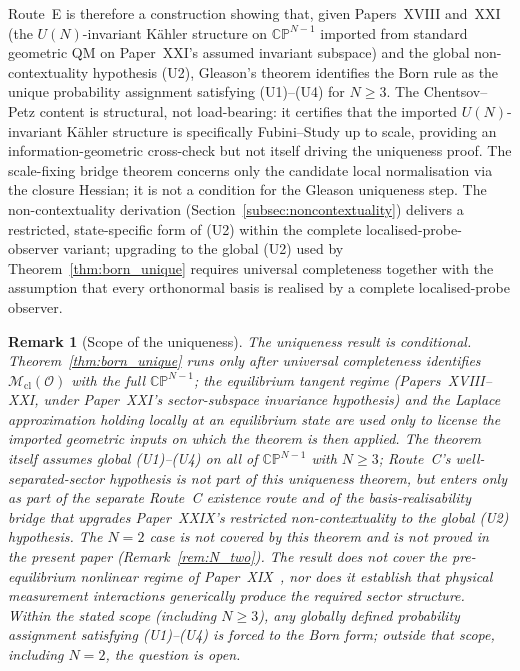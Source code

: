 \documentclass[12pt]{article}
\newtheorem{remark}[theorem]{Remark}
\newcommand{\Ocal}{\mathcal{O}}
\newcommand{\Mcl}{\mathcal{M}_{\mathrm{cl}}}
\begin{document}
Route~E is therefore a construction showing that, given Papers~XVIII and~XXI (the $U(N)$-invariant K\"ahler structure on $\mathbb{CP}^{N-1}$ imported from standard geometric QM on Paper~XXI's assumed invariant subspace) and the global non-contextuality hypothesis (U2), Gleason's theorem identifies the Born rule as the unique probability assignment satisfying (U1)--(U4) for $N \geq 3$. The Chentsov--Petz content is structural, not load-bearing: it certifies that the imported $U(N)$-invariant K\"ahler structure is specifically Fubini--Study up to scale, providing an information-geometric cross-check but not itself driving the uniqueness proof. The scale-fixing bridge theorem concerns only the candidate local normalisation via the closure Hessian; it is not a condition for the Gleason uniqueness step. The non-contextuality derivation (Section~\ref{subsec:noncontextuality}) delivers a restricted, state-specific form of (U2) within the complete localised-probe-observer variant; upgrading to the global (U2) used by Theorem~\ref{thm:born_unique} requires universal completeness together with the assumption that every orthonormal basis is realised by a complete localised-probe observer.

\begin{remark}[Scope of the uniqueness]\label{rem:scope}
The uniqueness result is conditional. Theorem~\ref{thm:born_unique} runs only after universal completeness identifies $\Mcl(\Ocal)$ with the full $\mathbb{CP}^{N-1}$; the equilibrium tangent regime (Papers~XVIII--XXI, under Paper~XXI's sector-subspace invariance hypothesis) and the Laplace approximation holding locally at an equilibrium state are used only to license the imported geometric inputs on which the theorem is then applied. The theorem itself assumes global (U1)--(U4) on all of $\mathbb{CP}^{N-1}$ with $N \geq 3$; Route~C's well-separated-sector hypothesis is \emph{not} part of this uniqueness theorem, but enters only as part of the separate Route~C existence route and of the basis-realisability bridge that upgrades Paper~XXIX's restricted non-contextuality to the global (U2) hypothesis. The $N = 2$ case is not covered by this theorem and is not proved in the present paper (Remark~\ref{rem:N_two}). The result does not cover the pre-equilibrium nonlinear regime of Paper~XIX~\citep{SmartXIX}, nor does it establish that physical measurement interactions generically produce the required sector structure. Within the stated scope (including $N \geq 3$), any globally defined probability assignment satisfying (U1)--(U4) is forced to the Born form; outside that scope, including $N = 2$, the question is open.
\end{remark}
\end{document}
